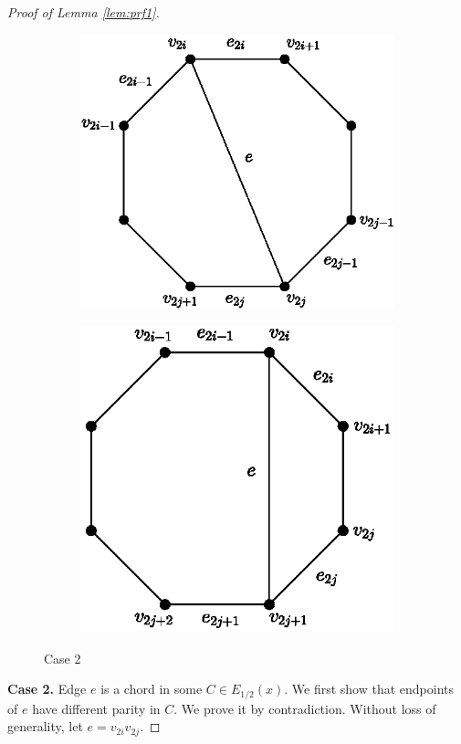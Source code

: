 \documentclass[11pt]{article}
\numberwithin{theorem}{section}
\begin{document}
\begin{proof}[Proof of Lemma \ref{lem:prf1}]
\begin{figure}
\centering
\begin{subfigure}{.4\textwidth}
  \centering
  \includegraphics[width=.85\linewidth]{KernelMengerianO-fig1a}
  \caption{}
  \label{fig1a}
\end{subfigure}%
\begin{subfigure}{.4\textwidth}
  \centering
  \includegraphics[width=.845\linewidth]{KernelMengerianO-fig1b}
  \caption{}
  \label{fig1b}
\end{subfigure}
\caption{Case 2}
\end{figure}
\textbf{Case 2.} Edge $e$ is a chord in some $C\in E_{1/2}(x)$. We first show that endpoints of $e$ have different parity in $C$. We prove it by contradiction. Without loss of generality, let $e=v_{2i}v_{2j}$.


\end{proof}
\end{document}
